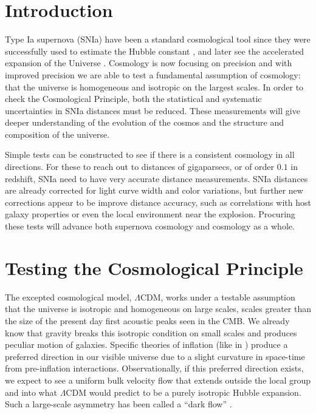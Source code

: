 \documentclass[apj, iop]{emulateapj}
\newcommand{\sn}{SNIa}
\newcommand{\todo}[1]{\textbf{\textcolor{red}{#1}}}
\begin{document}
\maketitle

\section{Introduction}\label{introduction} 

Type Ia supernova (\sn{}) have been a standard cosmological tool since they were
successfully used to estimate the Hubble constant \citep{Hamuy95,Riess95}, and
later see the accelerated expansion of the Universe
\citep{Riess98,Perlmutter99}. Cosmology is now focusing on precision and with
improved precision we are able to test a fundamental assumption of cosmology:
that the universe is homogeneous and isotropic on the largest scales. In order
to check the Cosmological Principle, both the statistical and systematic
uncertainties in \sn{} distances must be reduced. These measurements will give
deeper understanding of the evolution of the cosmos and the structure and
composition of the universe.

Simple tests can be constructed to see if there is a consistent cosmology in all
directions. For these to reach out to distances of gigaparsecs, or of order
$0.1$ in redshift, \sn{} need to have very accurate distance measurements. \sn{}
distances are already corrected for light curve width and color variations, but
further new corrections appear to be improve distance accuracy, such as
correlations with host galaxy properties or even the local environment near the
explosion. Procuring these tests will advance both supernova cosmology and
cosmology as a whole.

\section{Testing the Cosmological Principle}\label{testing-the-cosmological-principle}

The excepted cosmological model, $\Lambda$CDM, works under a testable assumption
that the universe is isotropic and homogeneous on large scales, scales greater
than the size of the present day first acoustic peaks seen in the CMB.
We already know that gravity breaks this isotropic condition on small scales and
produces peculiar motion of galaxies. Specific theories of inflation (like in
\cite{MersiniHoughton:2008io}) produce a preferred direction in our visible
universe due to a slight curvature in space-time from pre-inflation
interactions.  Observationally, if this preferred direction exists, we expect to
see a uniform bulk velocity flow that extends outside the local group and into
what $\Lambda$CDM would predict to be a purely isotropic Hubble expansion. Such
a large-scale asymmetry has been called a ``dark flow''
\cite{MersiniHoughton:2008io}. %
\end{document}
